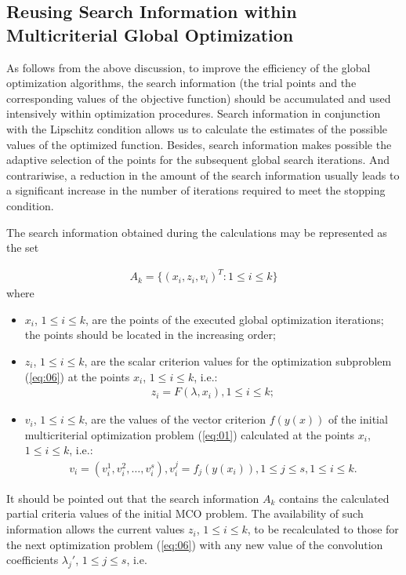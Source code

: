 \documentclass[smallcondensed]{svjour3}     %
\begin{document}
\subsection{Reusing Search Information within Multicriterial Global Optimization}
As follows from the above discussion, to improve the efficiency of the global optimization algorithms, the search information (the trial points and the corresponding values of the objective function) should be accumulated and used intensively within optimization procedures. Search information in conjunction with the Lipschitz condition allows us to calculate the estimates of the possible values of the optimized function. Besides, search information makes possible the adaptive selection of the points for the subsequent global search iterations. And contrariwise, a reduction in the amount of the search information usually leads to a significant increase in the number of iterations required to meet the stopping condition. \par

The search information obtained during the calculations may be represented as the set

\begin{eqnarray} \label{eq:08}
A_k = \{(x_i, z_i, v_i)^T: 1 \leq i \leq k \}
\end{eqnarray}
where
\begin{itemize}
	\item $x_i$, $1 \leq i \leq k$, are the points of the executed global optimization iterations; the points should be located in the increasing order;
	\item $z_i$, $1 \leq i \leq k$, are the scalar criterion values for the optimization subproblem (\ref{eq:06}) at the points $x_i$, $1 \leq i \leq k$, i.e.:
\begin{eqnarray*}
z_i = F(\lambda,x_i), 1 \leq i \leq k;
\end{eqnarray*}

	\item $v_i$, $1 \leq i \leq k$, are the values of the vector criterion $f(y(x))$ of the initial multicriterial optimization problem (\ref{eq:01}) calculated at the points  $x_i$, $1 \leq i \leq k$, i.e.:
\begin{eqnarray*}
v_i=(v_i^1,v_i^2,\dots,v_i^s ), v_i^j=f_j (y(x_i)), 1 \leq j \leq s, 1 \leq i \leq k.
\end{eqnarray*}

\end{itemize}

It should be pointed out that the search information $A_k$ contains the calculated partial criteria values of the initial MCO problem. The availability of such information allows the current values $z_i$, $1 \leq i \leq k$, to be recalculated to those for the next optimization problem (\ref{eq:06}) with any new value of the convolution coefficients $\lambda_j'$, $1 \leq j \leq s$, i.e.
\end{document}
